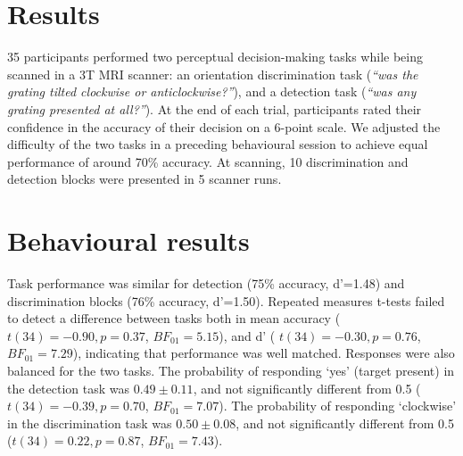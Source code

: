 \documentclass[12pt,twoside]{reedthesis}
\begin{document}
\hypertarget{results-4}{%
\section{Results}\label{results-4}}

35 participants performed two perceptual decision-making tasks while being scanned in a 3T MRI scanner: an orientation discrimination task (\emph{``was the grating tilted clockwise or anticlockwise?''}), and a detection task (\emph{``was any grating presented at all?''}). At the end of each trial, participants rated their confidence in the accuracy of their decision on a 6-point scale. We adjusted the difficulty of the two tasks in a preceding behavioural session to achieve equal performance of around 70\% accuracy. At scanning, 10 discrimination and detection blocks were presented in 5 scanner runs.

\hypertarget{behavioural-results}{%
\section{Behavioural results}\label{behavioural-results}}

Task performance was similar for detection (75\% accuracy, d'=1.48) and discrimination blocks (76\% accuracy, d'=1.50). Repeated measures t-tests failed to detect a difference between tasks both in mean accuracy (\(t(34) = -0.90, p = 0.37\), \(BF_{01}= 5.15\)), and d' ( \(t(34) = -0.30, p = 0.76\), \(BF_{01}=7.29\)), indicating that performance was well matched. Responses were also balanced for the two tasks. The probability of responding `yes' (target present) in the detection task was \(0.49 ± 0.11\), and not significantly different from 0.5 (\(t(34) = -0.39, p = 0.70\), \(BF_{01}=7.07\)). The probability of responding `clockwise' in the discrimination task was \(0.50 ± 0.08\), and not significantly different from 0.5 (\(t(34) = 0.22, p=0.87\), \(BF_{01}=7.43\)).
\end{document}

